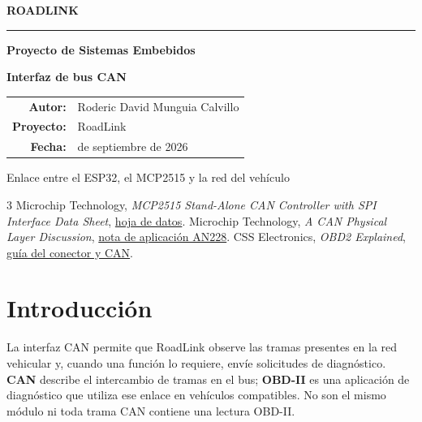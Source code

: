\documentclass[11pt,letterpaper]{article}
\begin{document}
\begin{titlepage}
  \pagecolor{RoadLight}
  \begin{center}
    \vspace*{1.0cm}
    {\sffamily\bfseries\fontsize{20}{24}\selectfont\color{RoadTeal} ROADLINK}\par
    \vspace{0.35cm}
    {\color{RoadTeal}\rule{0.82\textwidth}{2.2pt}}\par
    \vfill
    {\sffamily\bfseries\fontsize{28}{34}\selectfont\color{RoadGreen} Proyecto de Sistemas Embebidos}\par
    \vspace{0.35cm}
    {\sffamily\bfseries\fontsize{38}{44}\selectfont\color{RoadBlue} Interfaz de bus CAN}\par
    \vspace{0.8cm}\vfill
    \begin{tabular}{>{\sffamily\bfseries}r >{\sffamily}l}
      Autor: & Roderic David Munguia Calvillo \\
      Proyecto: & RoadLink \\
      Fecha: & 29 de septiembre de 2026 \\
    \end{tabular}
    \vfill
    \begin{minipage}{0.82\textwidth}\centering
      \colorbox{RoadGreen}{\parbox{0.94\textwidth}{\centering\color{white}\sffamily\small
        Enlace entre el ESP32, el MCP2515 y la red del vehículo}}
    \end{minipage}
    \vspace*{0.8cm}
  \end{center}
\end{titlepage}
\nopagecolor
{}
\tableofcontents
\begin{thebibliography}{3}
 Microchip Technology, \emph{MCP2515 Stand-Alone CAN Controller
with SPI Interface Data Sheet}, \href{https://ww1.microchip.com/downloads/en/DeviceDoc/MCP2515-Stand-Alone-CAN-Controller-with-SPI-20001801J.pdf}{hoja de datos}.
 Microchip Technology, \emph{A CAN Physical Layer Discussion},
\href{https://www.microchip.com/en-us/application-notes/an228}{nota de aplicación AN228}.
 CSS Electronics, \emph{OBD2 Explained},
\href{https://www.csselectronics.com/pages/obd2-explained-simple-intro}{guía del conector y CAN}.
\end{thebibliography}
\clearpage{}

\section{Introducción}
La interfaz CAN permite que RoadLink observe las tramas presentes en la red
vehicular y, cuando una función lo requiere, envíe solicitudes de diagnóstico.
\textbf{CAN} describe el intercambio de tramas en el bus; \textbf{OBD-II} es una
aplicación de diagnóstico que utiliza ese enlace en vehículos compatibles. No
son el mismo módulo ni toda trama CAN contiene una lectura OBD-II.
\end{document}
